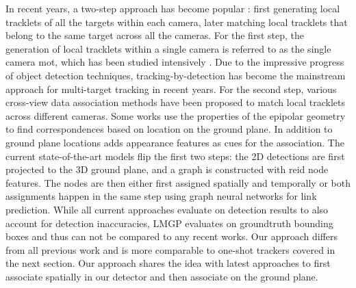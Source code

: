 \documentclass[10pt,twocolumn,letterpaper]{article}
\begin{document}
In recent years, a two-step approach has become popular \cite{synthehicle2023herzog}: first generating local tracklets of all the targets within each camera, later matching local tracklets that belong to the same target across all the cameras. For the first step, the generation of local tracklets within a single camera is referred to as the single camera \gls{mot}, which has been studied intensively \cite{bergmann2019tracking, zhang2021fairmot, zhou2020tracking, wang2020towards, feichtenhofer2017detect, Wojke2017simple, chen2018real}. Due to the impressive progress of object detection techniques, tracking-by-detection \cite{feichtenhofer2017detect, seidenschwarz2023simple,bergmann2019tracking, zhou2020tracking, Wojke2017simple} has become the mainstream approach for multi-target tracking in recent years. For the second step, various cross-view data association methods have been proposed to match local tracklets across different cameras. Some works \cite{hu2006principal, eshel2008homography} use the properties of the epipolar geometry to find correspondences based on location on the ground plane. In addition to ground plane locations \cite{xu2016multi} adds appearance features as cues for the association.
The current state-of-the-art models \cite{nguyen2022lmgp, cheng2023rest} flip the first two steps: the 2D detections are first projected to the 3D ground plane, and a graph is constructed with \gls{reid} node features. The nodes are then either first assigned spatially and temporally \cite{cheng2023rest} or both assignments happen in the same step \cite{nguyen2022lmgp} using graph neural networks for link prediction. While all current approaches \cite{cheng2023rest, seidenschwarz2023simple,bergmann2019tracking, zhang2021fairmot, zhou2020tracking} evaluate on detection results to also account for detection inaccuracies, LMGP \cite{nguyen2022lmgp} evaluates on groundtruth bounding boxes and thus can not be compared to any recent works.
Our approach differs from all previous work and is more comparable to one-shot trackers covered in the next section. Our approach shares the idea with latest approaches \cite{nguyen2022lmgp, cheng2023rest} to first associate spatially in our detector and then associate on the ground plane.  
\end{document}
